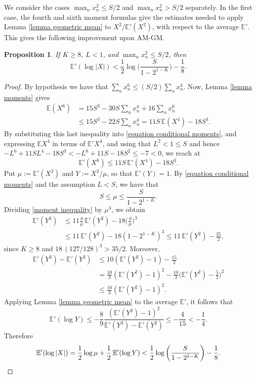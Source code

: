 \documentclass[reqno,12pt]{amsart}
\newtheorem{proposition}[theorem]{Proposition}
\theoremstyle{remark}
\newcommand{\EE}{\mathbb{E}}
\begin{document}
We consider the cases $\max_nx_n^2\leq S/2$ and $\max_nx_n^2>S/2$ separately. In the first case, the fourth and sixth moment formulas give the estimates needed to apply Lemma \ref{lemma geometric mean} to $X^2/\EE'(X^2)$, with respect to the average $\EE'$. This gives the following improvement upon AM-GM.

\begin{proposition}\label{prop small coordinates}
If $K\geq8$, $L<1$, and $\max_nx_n^2\leq S/2$, then
$$ \EE'(\log|X|) < \frac{1}{2}\log\bigg(\frac{S}{1-2^{1-K}}\bigg)-\frac{1}{8}. $$
\end{proposition}
\begin{proof}
By hypothesis we have that $\sum_nx_n^6\leq(S/2)\sum_nx_n^4$. Now, Lemma \ref{lemma moments} gives
\begin{align*}
\EE(X^6)&=15S^3-30S\sum_nx_n^4+16\sum_nx_n^6\\
&\leq 15S^3-22S\sum_n x_n^4
=11S\,\EE(X^4)-18S^3.
\end{align*}
By substituting this last inequality into \eqref{equation conditional moments}, and expressing $\EE X^4$ in terms of $\EE'X^4$, and using that $L^2<1\leq S$ and hence $-L^6+11SL^4-18S^3<-L^6+11S-18S^2\leq -7<0$, we reach at
\begin{equation}\label{moment inequality}
 \EE'(X^6)\leq 11S\,\EE'(X^4)-18S^3. 
\end{equation}
Put $\mu := \EE'(X^2)$ and $Y := X^2/\mu$, so that $\EE'(Y)=1$. By \eqref{equation conditional moments} and the assumption $L< S$, we have that
$$ S\leq\mu\leq\frac{S}{1-2^{1-K}}. $$
Dividing \eqref{moment inequality} by $\mu^3$, we obtain
\begin{align*}
\EE'(Y^3) &\leq 11\frac{S}{\mu}\,\EE'(Y^2)-18\bigg(\frac{S}{\mu}\bigg)^3\\
&\leq 11\,\EE'(Y^2)-18(1-2^{1-K})^3
\leq 11\,\EE'(Y^2)-\frac{35}{2},
\end{align*}
since $K\geq 8$ and $18\,(127/128)^3>35/2$. Moreover,
\begin{align*}
\EE'(Y^3)-\EE'(Y^2) &\leq 10(\EE'(Y^2)-1)-\frac{15}{2}\\
&=\frac{10}{3}(\EE'(Y^2)-1)^2-\frac{10}{3}\bigg(\EE'(Y^2)-\frac{5}{2}\bigg)^2\\
&\leq\frac{10}{3}(\EE'(Y^2)-1)^2.
\end{align*}
Applying Lemma \ref{lemma geometric mean} to the average $\EE'$, it follows that
$$ \EE'(\log Y)\leq-\frac{8}{9}\frac{(\EE'(Y^2)-1)^2}{\EE'(Y^3)-\EE'(Y^2)}\leq-\frac{4}{15}<-\frac{1}{4}. $$
Therefore
\[ \EE'(\log|X|)=\frac{1}{2}\log\mu+\frac{1}{2}\,\EE'(\log Y) < \frac{1}{2}\log\bigg(\frac{S}{1-2^{1-K}}\bigg)-\frac{1}{8}. \qedhere \]
\end{proof}
\end{document}
